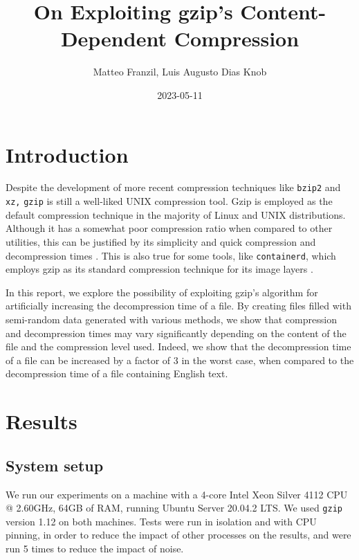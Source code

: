 \documentclass[a4paper,10pt,compsoc,conference]{IEEEtran}
\author{Matteo Franzil, Luis Augusto Dias Knob}
\date{2023-05-11}
\title{On Exploiting gzip's Content-Dependent Compression}
\begin{document}
\maketitle
\setlength{\parskip}{1pt}

\section{Introduction}
\label{sec:orgbf69b7c}

Despite the development of more recent compression techniques like \texttt{bzip2}
and \texttt{xz,} \texttt{gzip} is still a well-liked UNIX compression tool. Gzip is
employed as the default compression technique in the majority of Linux and
UNIX distributions. Although it has a somewhat poor compression ratio when
compared to other utilities, this can be justified by its simplicity and
quick compression and decompression times
\citep{GNUGzip,deutschDEFLATECompressedData1996}. This is also true for some
tools, like \texttt{containerd}, which employs gzip as its standard compression
technique for its image layers
\citep{MakeImageLayer,SupportParallelDecompression}.

In this report, we explore the possibility of exploiting gzip's
algorithm for artificially increasing the decompression time of a file. By
creating files filled with semi-random data generated with various methods,
we show that compression and decompression times may vary significantly
depending on the content of the file and the compression level used. Indeed,
we show that the decompression time of a file can be increased by a factor of
3 in the worst case, when compared to the decompression time of a file
containing English text.

\section{Results}
\label{sec:org27037a0}

\subsection{System setup}
\label{sec:org10faca4}

We run our experiments on a machine with a 4-core Intel Xeon Silver 4112 CPU
@ 2.60GHz, 64GB of RAM, running Ubuntu Server 20.04.2 LTS. We used \texttt{gzip}
version 1.12 on both machines. Tests were run in isolation and with
CPU pinning, in order to reduce the impact of other processes on the results,
and were run 5 times to reduce the impact of noise.
\end{document}
